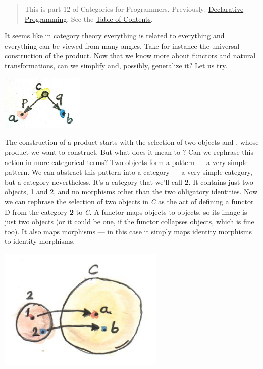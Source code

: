 \begin{quote}
This is part 12 of Categories for Programmers. Previously:
\href{https://bartoszmilewski.com/2015/04/15/category-theory-and-declarative-programming/}{Declarative
Programming}. See the
\href{https://bartoszmilewski.com/2014/10/28/category-theory-for-programmers-the-preface/}{Table
of Contents}.
\end{quote}

It seems like in category theory everything is related to everything and
everything can be viewed from many angles. Take for instance the
universal construction of the
\href{https://bartoszmilewski.com/2015/01/07/products-and-coproducts/}{product}.
Now that we know more about
\href{https://bartoszmilewski.com/2015/01/20/functors/}{functors} and
\href{https://bartoszmilewski.com/2015/04/07/natural-transformations/}{natural
transformations}, can we simplify and, possibly, generalize it? Let us
try.

\includegraphics[width=1.56250in]{images/productpattern.jpg}

The construction of a product starts with the selection of two objects
 and , whose product we want to construct. But what
does it mean to ? Can we rephrase this action in
more categorical terms? Two objects form a pattern --- a very simple
pattern. We can abstract this pattern into a category --- a very simple
category, but a category nevertheless. It's a category that we'll call
\textbf{2}. It contains just two objects, 1 and 2, and no morphisms
other than the two obligatory identities. Now we can rephrase the
selection of two objects in \emph{C} as the act of defining a functor D
from the category \textbf{2} to \emph{C}. A functor maps objects to
objects, so its image is just two objects (or it could be one, if the
functor collapses objects, which is fine too). It also maps morphisms
--- in this case it simply maps identity morphisms to identity
morphisms.

\includegraphics[width=3.12500in]{images/two.jpg}

